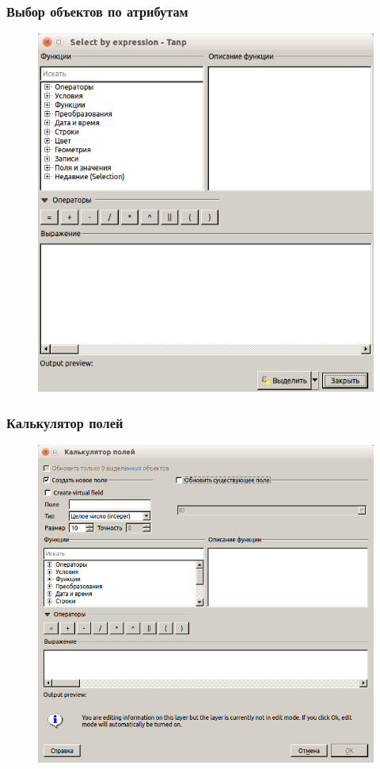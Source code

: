 
\begin{frame}
    \frametitle{Выбор объектов по атрибутам}
    \begin{figure}[!ht]
        \begin{center}
            \includegraphics[width=0.6\columnwidth]{./vector_data/img/select_dialog}
        \end{center}
    \end{figure}
\end{frame}

\begin{frame}
    \frametitle{Калькулятор полей}
        \begin{figure}[!ht]
        \begin{center}
            \includegraphics[width=0.6\columnwidth]{./vector_data/img/calculator}
        \end{center}
    \end{figure}
\end{frame}
